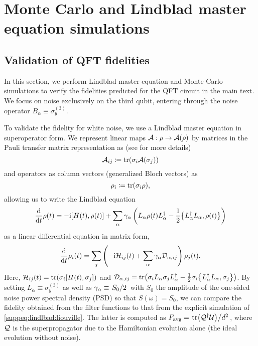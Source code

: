 \chapter{Monte Carlo and Lindblad master equation simulations}
\section{Validation of QFT fidelities}
In this section, we perform Lindblad master equation and Monte Carlo simulations to verify the fidelities predicted for the QFT circuit in the main text. We focus on noise exclusively on the third qubit, entering through the noise operator $B_\alpha\equiv\sigma_y^{(3)}$. 

To validate the fidelity for white noise, we use a Lindblad master equation \cite{Lindblad1976,Gorini1976} in superoperator form. We represent linear maps $\mathcal{A}: \rho\rightarrow\mathcal{A}(\rho)$ by matrices in the Pauli transfer matrix representation as (see  for more details)
\begin{equation}
    \mathcal{A}_{ij} \coloneqq \tr(\sigma_i\mathcal{A}(\sigma_j))
\end{equation}
and operators as column vectors (\ie generalized Bloch vectors) as
\begin{equation}
    \rho_i \coloneqq \tr(\sigma_i\rho),
\end{equation}
allowing us to write the Lindblad equation
\begin{equation}
    \dv{t}\rho(t) = -\i\comm{H(t)}{\rho(t)} + \sum_\alpha \gamma_\alpha\left(L_\alpha\rho(t) L_\alpha\adjoint - \frac{1}{2}\acomm{L_\alpha\adjoint L_\alpha}{\rho(t)}\right)
\end{equation}
as a linear differential equation in matrix form,
\begin{equation}\label{suppeq:lindlbad:liouville}
    \dv{t}\rho_i(t) = \sum_j\left(-\mathrm{i}\mathcal{H}_{ij}(t)+ \sum_\alpha \gamma_\alpha \mathcal{D}_{\alpha, ij}\right)\rho_j(t).
\end{equation}
Here, $\mc{H}_{ij}(t) = \tr(\sigma_i\comm{H(t)}{\sigma_j})$ and $\mc{D}_{\alpha, ij} = \tr(\sigma_i L_\alpha\sigma_j L_\alpha\adjoint - \frac{1}{2}\sigma_i \acomm{L_\alpha\adjoint L_\alpha}{\sigma_j})$. By setting $L_\alpha\equiv\sigma_y^{(3)}$ as well as $\gamma_\alpha\equiv\flatfrac{S_0}{2}$ with $S_0$ the amplitude of the one-sided noise power spectral density (PSD) so that $S(\omega) = S_0$, we can compare the fidelity obtained from the filter functions to that from the explicit simulation of \cref{suppeq:lindlbad:liouville}. The latter is computed as $\avgfid = \flatfrac{\tr(\mc{Q}\adjoint\mc{U})}{d^2}$, where $\mathcal{Q}$ is the superpropagator due to the Hamiltonian evolution alone (\ie the ideal evolution without noise).

